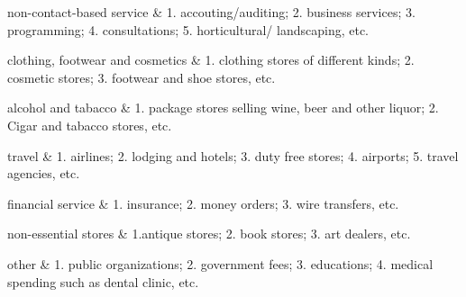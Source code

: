 non-contact-based service            & 1. accouting/auditing; 2. business services; 3. programming; 4. consultations; 5. horticultural/ landscaping, etc.                                                \\\hline

clothing, footwear and cosmetics     & 1. clothing stores of different kinds; 2. cosmetic stores; 3. footwear and shoe stores, etc.                                                                      \\\hline

alcohol and tabacco                  & 1. package stores selling wine, beer and other liquor; 2. Cigar and tabacco stores, etc.                                                                          \\\hline

travel                               & 1. airlines; 2. lodging and hotels; 3. duty free stores; 4. airports; 5. travel agencies, etc.                                                                    \\\hline

financial service                    & 1. insurance; 2. money orders; 3. wire transfers, etc.                                                                                                            \\\hline

non-essential stores                 & 1.antique stores; 2. book stores; 3. art dealers, etc.                                                                                                            \\\hline

other                                & 1. public organizations; 2. government fees; 3. educations; 4. medical spending such as dental clinic, etc.                                                       \\ 
\hline
\bottomrule
